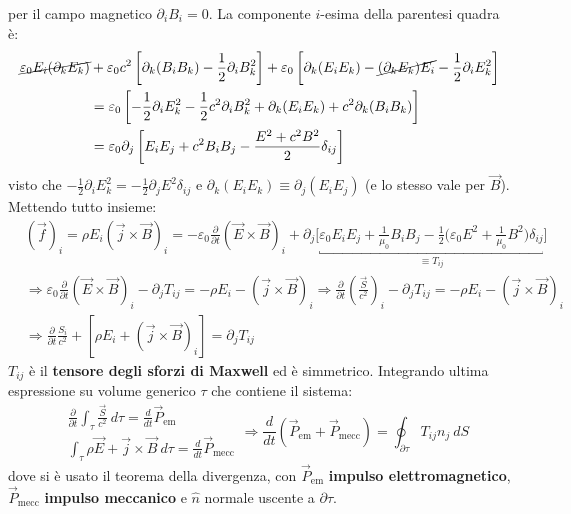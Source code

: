 \documentclass[10pt, a4paper]{scrartcl}
\numberwithin{equation}{subsection}
\theoremstyle{style1}
\begin{document}
per il campo magnetico $\partial _i B_i = 0$. La componente $i$-esima della parentesi quadra \`e:
\[
	\begin{split}
		\cancel{\varepsilon _0 E_i (\partial _k E_k)} &+ \varepsilon _0 c^2 \left[ \partial _k (B_i B_k) - \frac{1}{2}\partial _i B_k^2 \right] + \varepsilon _0 \left[ \partial _k (E_i E_k) - \cancel{(\partial _k E_k) E_i} -\frac{1}{2}\partial _i E_k^2\right] \\
							      &= \varepsilon _0 \left[ -\frac{1}{2}\partial _i E_k^2 - \frac{1}{2}c^2 \partial _i B_k^2 + \partial _k (E_iE_k) + c^2 \partial _k (B_i B_k) \right] \\
							      &=\varepsilon _0 \partial _j \left[ E_i E_j+c^2 B_i B_j - \frac{E^2 + c^2 B^2}{2}\delta _{ij}  \right] 
	\end{split}
\] 
visto che $-\frac{1}{2}\partial _i E_k^2 = - \frac{1}{2}\partial _j E^2 \delta _{ij} $ e $\partial _k (E_i E_k) \equiv \partial _j (E_i E_j)$ (e lo stesso vale per $\vec{B}$). Mettendo tutto insieme:
\begin{equation}
	\begin{split}
		&(\vec{f})_i = \rho E_i  (\vec{j}\times \vec{B})_i = -\varepsilon _0 \frac{\partial }{\partial t} (\vec{E}\times \vec{B})_i + \partial _j \bigg[ \underbracket{\varepsilon _0 E_i E_j + \frac{1}{\mu_0} B_i B_j -\frac{1}{2} \Big(\varepsilon _0E^2 + \frac{1}{\mu_0} B^2 \Big) \delta _{ij} }_{\equiv  T_{ij} }   \bigg] \\
		&\Rightarrow \varepsilon _0 \frac{\partial }{\partial t} (\vec{E}\times \vec{B})_i - \partial _j T_{ij}  = - \rho E_i - (\vec{j}\times \vec{B})_i \Rightarrow \frac{\partial }{\partial t} \left(\frac{\vec{S}}{c^2}\right) _i - \partial _j T_{ij} =-\rho E_i - (\vec{j}\times \vec{B})_i\\
		&\Rightarrow \frac{\partial }{\partial t} \frac{S_i}{c^2} + \left[ \rho  E_i + (\vec{j}\times \vec{B})_i \right]  = \partial _j T_{ij} 
	\end{split}
\end{equation}
$T_{ij} $ \`e il \textbf{tensore degli sforzi di Maxwell} ed \`e simmetrico. Integrando ultima espressione su volume generico $\tau $ che contiene il sistema:
\begin{equation}
	\begin{split}
		&\frac{\partial }{\partial t} \int_{\tau } \frac{\vec{S}}{c^2} \ d\tau = \frac{d }{d t} \vec{P}_\text{em}\\
		&\int_{\tau } \rho \vec{E}+ \vec{j}\times \vec{B}\ d\tau = \frac{d }{d t}  \vec{P}_\text{mecc}
	\end{split} \Rightarrow \frac{d }{d t} (\vec{P}_\text{em}+\vec{P}_\text{mecc}) = \oint_{\partial \tau } T_{ij} n_j \ dS
\end{equation}
dove si \`e usato il teorema della divergenza, con $\vec{P}_\text{em}$ \textbf{impulso elettromagnetico}, $\vec{P}_\text{mecc}$ \textbf{impulso meccanico} e $\hat{n}$ normale uscente a $\partial \tau $.
\end{document}
